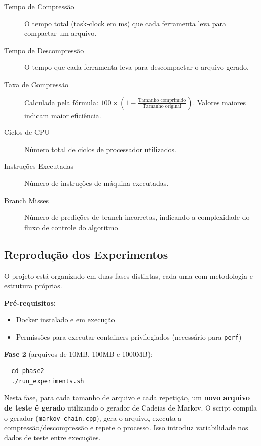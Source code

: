 \documentclass[acmsmall]{acmart}
\begin{document}
\begin{description}
  \item[Tempo de Compressão] O tempo total (task-clock em ms) que cada ferramenta leva para compactar um arquivo.

  \item[Tempo de Descompressão] O tempo que cada ferramenta leva para descompactar o arquivo gerado.

  \item[Taxa de Compressão] Calculada pela fórmula: $100 \times \left(1 - \frac{\text{Tamanho comprimido}}{\text{Tamanho original}}\right)$. Valores maiores indicam maior eficiência.

  \item[Ciclos de CPU] Número total de ciclos de processador utilizados.

  \item[Instruções Executadas] Número de instruções de máquina executadas.

  \item[Branch Misses] Número de predições de branch incorretas, indicando a complexidade do fluxo de controle do algoritmo.
\end{description}

\subsection{Reprodução dos Experimentos}

O projeto está organizado em duas fases distintas, cada uma com metodologia e estrutura próprias.

\textbf{Pré-requisitos:}
\begin{itemize}
  \item Docker instalado e em execução
  \item Permissões para executar containers privilegiados (necessário para \texttt{perf})
\end{itemize}

\textbf{Fase 2} (arquivos de 10MB, 100MB e 1000MB):
\begin{verbatim}
  cd phase2
  ./run_experiments.sh
\end{verbatim}

Nesta fase, para cada tamanho de arquivo e cada repetição, um \textbf{novo arquivo de teste é gerado} utilizando o gerador de Cadeias de Markov. O script compila o gerador (\texttt{markov\_chain.cpp}), gera o arquivo, executa a compressão/descompressão e repete o processo. Isso introduz variabilidade nos dados de teste entre execuções.
\end{document}
